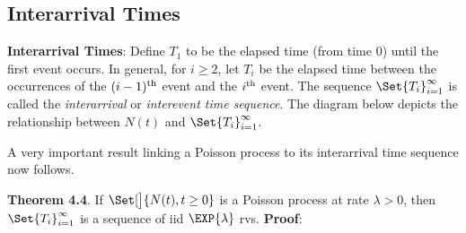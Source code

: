 \subsection*{Interarrival Times}
\begin{Regular}
    \textbf{Interarrival Times}: Define $ T_1 $ to be the elapsed time (from time $0$) until the first event occurs.
    In general, for $ i\ge 2 $, let $ T_i $ be the elapsed time between the occurrences of the $ (i-1)\textsuperscript{th} $
    event and the $ i\textsuperscript{th} $ event. The sequence $ \Set{T_i}_{i=1}^\infty $ is called the \emph{interarrival} or
    \emph{interevent time sequence}. The diagram below depicts the relationship between $ N(t) $ and $ \Set{T_i}_{i=1}^\infty $.
\end{Regular}
A very important result linking a Poisson process to its interarrival time sequence now follows.
\begin{Result}
    \textbf{Theorem 4.4}. If $ \Set[\big]{N(t),t\ge 0} $ is a Poisson process at rate $ \lambda>0 $, then $ \Set{T_i}_{i=1}^\infty $
    is a sequence of iid $ \EXP{\lambda} $ rvs.
    \tcblower{}
    \textbf{Proof}:
\end{Result}
